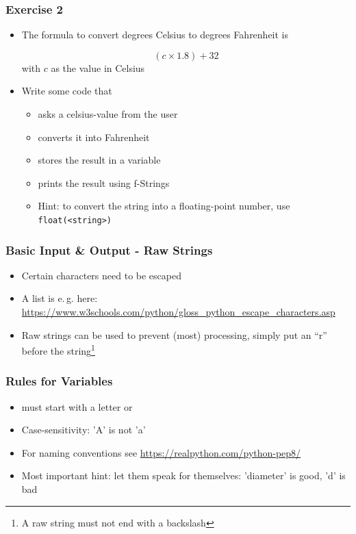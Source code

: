 \documentclass[ngerman]{beamer}
\begin{document}
\begin{frame}
\frametitle{Exercise 2}

\begin{itemize}
\item The formula to convert degrees Celsius to \newline degrees Fahrenheit is

\[  (c \times 1.8) + 32 \] with $c$ as the value in Celsius

\item Write some code that 

\begin{itemize}
	\item asks a celsius-value from the user
	\item converts it into Fahrenheit 
	\item stores the result in a variable
	\item prints the result using f-Strings
	\item Hint: to convert the string into a \newline floating-point number, use \texttt{float(<string>)}
	\end{itemize}

\end{itemize}
\end{frame}


\begin{frame}[fragile]
\frametitle{Basic Input \& Output - Raw Strings}

\begin{itemize}
	\item Certain characters need to be escaped
	\item A list is e.\,g. here: \url{https://www.w3schools.com/python/gloss_python_escape_characters.asp} 
	\item Raw strings can be used to prevent (most) processing, simply put an \enquote{r} before the string\footnote{A raw string must not end with a backslash}
	\end{itemize}




\end{frame}


\begin{frame}
\frametitle{Rules for Variables}

\begin{itemize}
\item must start with a letter or \textunderscore
\item Case-sensitivity: 'A' is not 'a'
\item For naming conventions see \url{https://realpython.com/python-pep8/}
\item Most important hint: let them speak for themselves: 'diameter' is good, 'd' is bad 
\end{itemize}
\end{frame}
\end{document}
